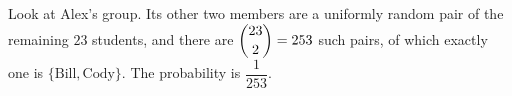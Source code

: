 Look at Alex's group. Its other two members are a uniformly random pair of the remaining $23$ students, and there are $\dbinom{23}{2}=253$ such pairs, of which exactly one is $\{\text{Bill},\text{Cody}\}$. The probability is $\boxed{\dfrac{1}{253}}$.
